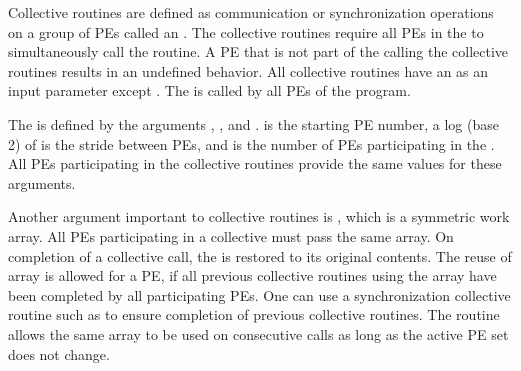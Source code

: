 
Collective routines are defined as communication or synchronization operations 
on a group of \acp{PE} called an \activeset{}. The collective routines require all
\acp{PE} in the \activeset{} to simultaneously call the routine. 
A \ac{PE} that is not part of the \activeset{} calling the collective 
routines results in an undefined behavior.  All
collective routines have an \activeset{} as an input parameter except
\barrierall{}. The \barrierall{} is called by all \acp{PE} of the \openshmem{} program. 

The \activeset{} is defined by the arguments , , 
and .   is the starting \ac{PE} number, a log (base
2) of  is the stride between \acp{PE}, and  is
the number of \acp{PE} participating in the \activeset{}.  All \acp{PE} participating in the 
collective routines provide the same values for these arguments. 
 
Another argument important to collective routines is , which is a
symmetric work array.  All \acp{PE} participating in a collective must pass the same
 array.  On completion of a collective call, the  is restored to its 
original contents.  The reuse of  array is allowed for a \ac{PE}, if
all previous collective routines using the  array have been completed by all participating 
\acp{PE}.  One can use a synchronization collective routine such as \barrier{}
to ensure completion of previous collective routines. The  routine allows the same  array to be used on consecutive calls as long as the active \ac{PE} set does not change. 

%


